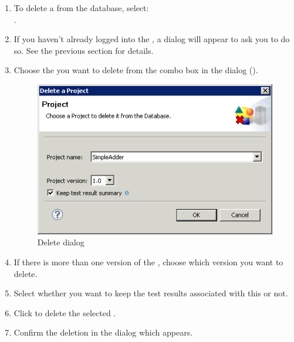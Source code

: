 \begin{enumerate}
\item To delete a \gdproject{} from the database, select:\\
.
\item If you haven't already logged into the \gddb{}, a dialog will appear to ask you to do so.  See the previous section  for details. 
\item Choose the \gdproject{} you want to delete from the combo box in the dialog ().
 \begin{figure}[h]
\begin{center}
\includegraphics{Tasks/Projects/PS/deleteproject}
\caption{Delete \gdproject{} dialog}
\label{deleteproject}
\end{center}
\end{figure}

\item If there is more than one version of the \gdproject{}, choose which version you want to delete. 
\item Select whether you want to keep the test results associated with this \gdproject{} or not. 
\item Click  to delete the selected \gdproject{}. 
\item Confirm the deletion in the dialog which appears.
\end{enumerate}
